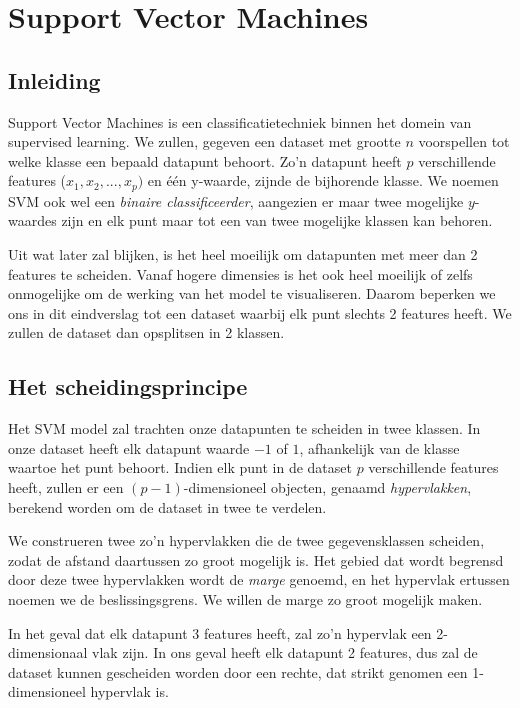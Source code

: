 \documentclass[TeamE-eindrapport]{subfiles}
\begin{document}
	
	\chapter{Support Vector Machines}
	
	\label{tekst:svm}
	
	\section{Inleiding}
	
	Support Vector Machines is een classificatietechniek binnen het domein van supervised learning. We zullen, gegeven een dataset met grootte \(n\) voorspellen tot welke klasse een bepaald datapunt behoort. Zo'n datapunt heeft \(p\) verschillende features (\(x_1, x_2, ..., x_p)\) en één y-waarde, zijnde de bijhorende klasse. We noemen SVM ook wel een \textit{binaire classificeerder}, aangezien er maar twee mogelijke \(y\)-waardes zijn en elk punt maar tot een van twee mogelijke klassen kan behoren.
	
	Uit wat later zal blijken, is het heel moeilijk om datapunten met meer dan 2 features te scheiden. Vanaf hogere dimensies is het ook heel moeilijk of zelfs onmogelijke om de werking van het model te visualiseren. Daarom beperken we ons in dit eindverslag tot een dataset waarbij elk punt slechts 2 features heeft. We zullen de dataset dan opsplitsen in 2 klassen.
	
	\section{Het scheidingsprincipe}
	
	Het SVM model zal trachten onze datapunten te scheiden in twee klassen. In onze dataset heeft elk datapunt waarde \(-1\) of \(1\), afhankelijk van de klasse waartoe het punt behoort. Indien elk punt in de dataset \(p\) verschillende features heeft, zullen er een \((p-1)\)-dimensioneel objecten, genaamd \textit{hypervlakken}, berekend worden om de dataset in twee te verdelen. 
	
	We construeren twee zo'n hypervlakken die de twee gegevensklassen scheiden, zodat de afstand daartussen zo groot mogelijk is. Het gebied dat wordt begrensd door deze twee hypervlakken wordt de \textit{marge} genoemd, en het hypervlak ertussen noemen we de beslissingsgrens. We willen de marge zo groot mogelijk maken.
	
	In het geval dat elk datapunt 3 features heeft, zal zo'n hypervlak een 2-dimensionaal vlak zijn. In ons geval heeft elk datapunt 2 features, dus zal de dataset kunnen gescheiden worden door een rechte, dat strikt genomen een 1-dimensioneel hypervlak is.
	
\end{document}
